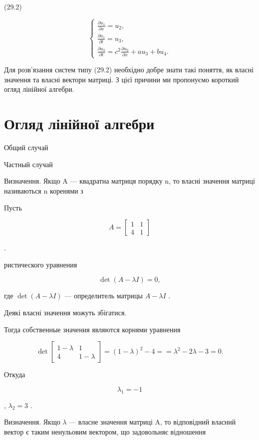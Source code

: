 \documentclass[
  ukrainian,
]{article}
\begin{document}
(29.2)

\[
\begin{cases} \frac{\partial u_1}{\partial x} = u_2, \\ \frac{\partial a_1}{\partial t} = u_3, \\ \frac{\partial u_3}{\partial t} = c^2 \frac{\partial u_2}{\partial x} + au_3 + bu_4. \end{cases}
\]

Для розв'язання систем типу (29.2) необхідно добре знати такі поняття,
як власні значення та власні вектори матриці. З цієї причини ми
пропонуємо короткий огляд лінійної алгебри.

\section{Огляд лінійної
алгебри}\label{ux43eux433ux43bux44fux434-ux43bux456ux43dux456ux439ux43dux43eux457-ux430ux43bux433ux435ux431ux440ux438}

Общий случай

Частный случай

Визначення. Якщо A --- квадратна матриця порядку n, то власні значення
матриці називаються n коренями з

Пусть

\[
A =
\begin{bmatrix} 1 & 1 \\ 4 & 1 \end{bmatrix}
\]

.

ристического уравнения

\[
\det\left(A-\lambda I\right)=0,
\]

где \(\det(A-\lambda I)\) --- определитель матрицы \(A-\lambda I\) .

Деякі власні значення можуть збігатися.

Тогда собственные значения являются корнями уравнения

\[
\det
\begin{bmatrix} 1-\lambda & 1\\ 4 & 1-\lambda \end{bmatrix}
= (1-\lambda)^2 - 4 =
= \lambda^2 - 2\lambda - 3 = 0.
\]

Откуда

\[
\lambda_1 = -1
\]

, \(\lambda_2 = 3\) .

Визначення. Якщо \(\lambda\) --- власне значення матриці A, то
відповідний власний вектор є таким ненульовим вектором, що задовольняє
відношення
\end{document}
